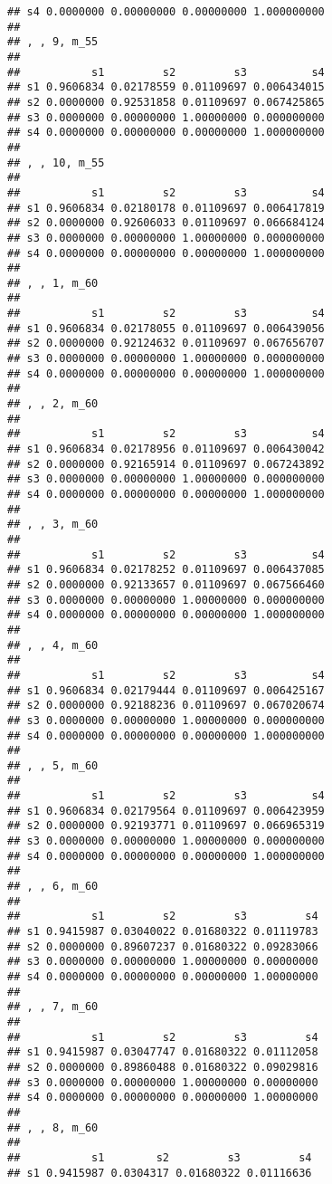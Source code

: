 \documentclass[
]{article}
\begin{document}
\begin{verbatim}
## s4 0.0000000 0.00000000 0.00000000 1.000000000
## 
## , , 9, m_55
## 
##           s1         s2         s3          s4
## s1 0.9606834 0.02178559 0.01109697 0.006434015
## s2 0.0000000 0.92531858 0.01109697 0.067425865
## s3 0.0000000 0.00000000 1.00000000 0.000000000
## s4 0.0000000 0.00000000 0.00000000 1.000000000
## 
## , , 10, m_55
## 
##           s1         s2         s3          s4
## s1 0.9606834 0.02180178 0.01109697 0.006417819
## s2 0.0000000 0.92606033 0.01109697 0.066684124
## s3 0.0000000 0.00000000 1.00000000 0.000000000
## s4 0.0000000 0.00000000 0.00000000 1.000000000
## 
## , , 1, m_60
## 
##           s1         s2         s3          s4
## s1 0.9606834 0.02178055 0.01109697 0.006439056
## s2 0.0000000 0.92124632 0.01109697 0.067656707
## s3 0.0000000 0.00000000 1.00000000 0.000000000
## s4 0.0000000 0.00000000 0.00000000 1.000000000
## 
## , , 2, m_60
## 
##           s1         s2         s3          s4
## s1 0.9606834 0.02178956 0.01109697 0.006430042
## s2 0.0000000 0.92165914 0.01109697 0.067243892
## s3 0.0000000 0.00000000 1.00000000 0.000000000
## s4 0.0000000 0.00000000 0.00000000 1.000000000
## 
## , , 3, m_60
## 
##           s1         s2         s3          s4
## s1 0.9606834 0.02178252 0.01109697 0.006437085
## s2 0.0000000 0.92133657 0.01109697 0.067566460
## s3 0.0000000 0.00000000 1.00000000 0.000000000
## s4 0.0000000 0.00000000 0.00000000 1.000000000
## 
## , , 4, m_60
## 
##           s1         s2         s3          s4
## s1 0.9606834 0.02179444 0.01109697 0.006425167
## s2 0.0000000 0.92188236 0.01109697 0.067020674
## s3 0.0000000 0.00000000 1.00000000 0.000000000
## s4 0.0000000 0.00000000 0.00000000 1.000000000
## 
## , , 5, m_60
## 
##           s1         s2         s3          s4
## s1 0.9606834 0.02179564 0.01109697 0.006423959
## s2 0.0000000 0.92193771 0.01109697 0.066965319
## s3 0.0000000 0.00000000 1.00000000 0.000000000
## s4 0.0000000 0.00000000 0.00000000 1.000000000
## 
## , , 6, m_60
## 
##           s1         s2         s3         s4
## s1 0.9415987 0.03040022 0.01680322 0.01119783
## s2 0.0000000 0.89607237 0.01680322 0.09283066
## s3 0.0000000 0.00000000 1.00000000 0.00000000
## s4 0.0000000 0.00000000 0.00000000 1.00000000
## 
## , , 7, m_60
## 
##           s1         s2         s3         s4
## s1 0.9415987 0.03047747 0.01680322 0.01112058
## s2 0.0000000 0.89860488 0.01680322 0.09029816
## s3 0.0000000 0.00000000 1.00000000 0.00000000
## s4 0.0000000 0.00000000 0.00000000 1.00000000
## 
## , , 8, m_60
## 
##           s1        s2         s3         s4
## s1 0.9415987 0.0304317 0.01680322 0.01116636

\end{verbatim}
\end{document}
